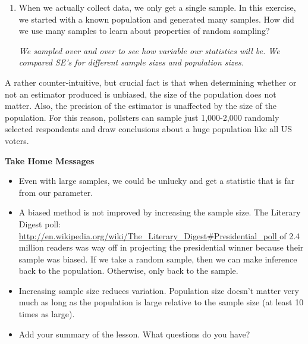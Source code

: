 \begin{enumerate}
     \item When we actually collect data, we only get a single sample.
       In this exercise, we started with a known population and
       generated many samples. How did we use many samples to learn
       about properties of random sampling?
\begin{students}
  \vspace{4cm}
\end{students}    
\begin{key}
   {\it  We sampled over and over to see how variable our statistics
     will be.  We compared SE's for different sample sizes and
     population sizes. }
\end{key}

  \end{enumerate}

  A rather counter-intuitive, but  crucial fact is that when
  determining whether or not an estimator produced is unbiased, the
  size of the population does not matter. Also, the precision of the
  estimator is unaffected by the size of the population. For this
  reason, pollsters can  sample just 1,000-2,000 randomly selected
  respondents and draw conclusions about a huge population like all US
  voters. 

  \begin{center}
    {\bf Take Home Messages}
  \end{center}
 
  \begin{itemize}
  \item Even with large samples, we could be unlucky and get a
    statistic that is far from our parameter.
  \item A biased method is not improved by increasing the sample size.
    The Literary Digest poll:\\
    \url{http://en.wikipedia.org/wiki/The_Literary_Digest#Presidential_poll
    } of 2.4 million
    readers was way off in projecting the presidential winner because
    their sample was biased.
    If we take a random sample, then we can make inference back to the
    population. Otherwise, only back to the sample.

  \item Increasing sample size reduces variation.  Population size
    doesn't matter very  much as long as the population is large
    relative to the sample size (at least 10 times as large).
  \item Add your summary of the lesson.  What questions do you have?
  \end{itemize}\vspace{\fill}




